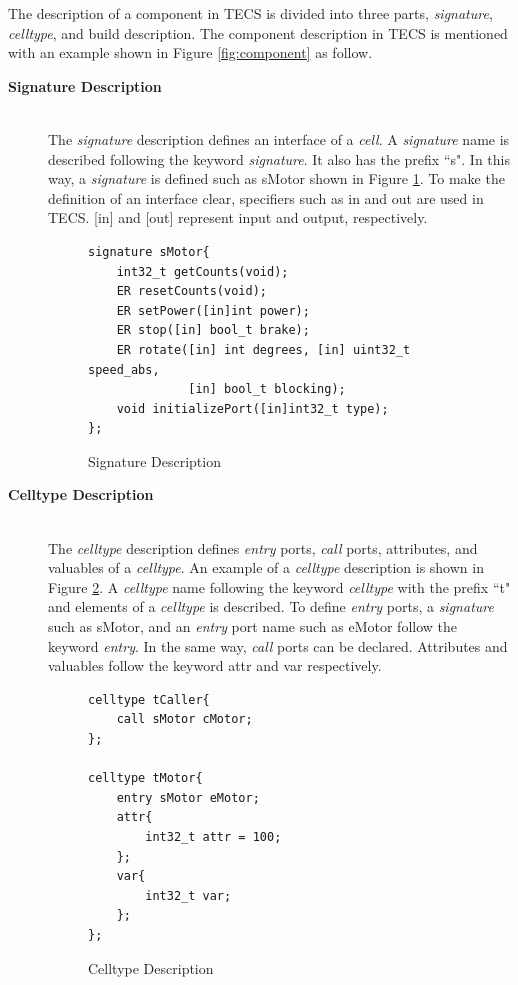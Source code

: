 \documentclass[conference,compsoc]{IEEEtran}
\begin{document}
The description of a component in TECS is divided into three parts, {\it signature}, {\it celltype}, and build description.
The component description in TECS is mentioned with an example shown in Figure \ref{fig:component} as follow.

\begin{description}
    \item[{\bf Signature Description}]\mbox{}\\
        The {\it signature} description defines an interface of a {\it cell}.
        A {\it signature} name is described following the keyword {\it signature}.
        It also has the prefix ``s".
        In this way, a {\it signature} is defined such as sMotor shown in Figure \ref{signature}.
        To make the definition of an interface clear, specifiers such as in and out are used in TECS.
        [in] and [out] represent input and output, respectively.\\
\begin{figure}[t]
\centering
\begin{lstlisting}
signature sMotor{
    int32_t getCounts(void);
    ER resetCounts(void);
    ER setPower([in]int power);
    ER stop([in] bool_t brake);
    ER rotate([in] int degrees, [in] uint32_t speed_abs,
              [in] bool_t blocking);
    void initializePort([in]int32_t type);
};
\end{lstlisting}
\caption{Signature Description}
\label{signature}
\end{figure}

    \item[{\bf Celltype Description}]\mbox{}\\
        The {\it celltype} description defines {\it entry} ports, {\it call} ports, attributes, and valuables of a {\it celltype}.
        An example of a {\it celltype} description is shown in Figure \ref{celltype}.
        A {\it celltype} name following the keyword {\it celltype} with the prefix ``t" and elements of a {\it celltype} is described.
        To define {\it entry} ports, a {\it signature} such as sMotor, and an {\it entry} port name such as eMotor follow the keyword {\it entry}.
        In the same way, {\it call} ports can be declared.
        Attributes and valuables follow the keyword attr and var respectively.\\
\begin{figure}[t]
\centering
\begin{lstlisting}
celltype tCaller{
    call sMotor cMotor;
};

celltype tMotor{
    entry sMotor eMotor;
    attr{
        int32_t attr = 100;
    };
    var{
        int32_t var;
    };
};
\end{lstlisting}
\caption{Celltype Description}
\label{celltype}
\end{figure}


\end{description}
\end{document}
